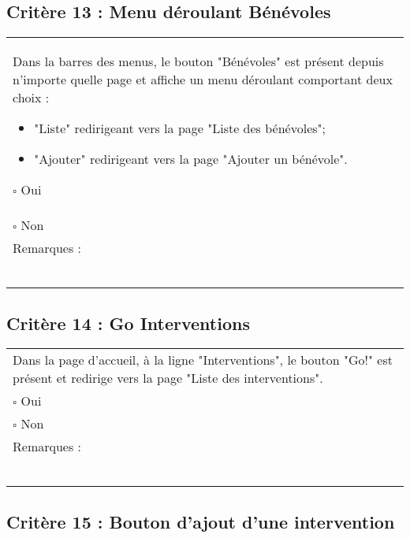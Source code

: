   		
  			\subsection*{Critère 13 : Menu déroulant Bénévoles}
	
	\begin{center}
    	 		\begin{tabular}[h]{|p{}|}
			\hline
				Dans la barres des menus, le bouton "Bénévoles" est présent depuis n'importe quelle page et affiche un menu déroulant comportant deux choix : 
				\begin{itemize}
					\item "Liste" redirigeant vers la page "Liste des bénévoles";
					\item "Ajouter" redirigeant vers la page "Ajouter un bénévole".
				\end{itemize}
				$\square$ Oui  \\ $\square$ Non \\\hline Remarques : \\ ~\\
			 \\\hline
     		\end{tabular}
  		\end{center}
  		
  		
  			
  		
  		\subsection*{Critère 14 : Go Interventions}
	
	\begin{center}
    	 		\begin{tabular}[h]{|p{}|}
			\hline
				Dans la page d'accueil, à la ligne "Interventions", le bouton "Go!" est présent et redirige vers la page "Liste des interventions".\\
				$\square$ Oui  \\ $\square$ Non \\\hline Remarques : \\ ~\\
			 \\\hline
     		\end{tabular}
  		\end{center}	
  		
  		
  	\subsection*{Critère 15 : Bouton d'ajout d'une intervention}
	
